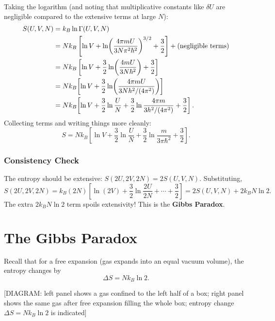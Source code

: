 Taking the logarithm (and noting that multiplicative constants like $\delta U$ are negligible compared to the extensive terms at large $N$):
\begin{align}
    S(U, V, N) &= k_B\ln\Gamma(U,V,N) \notag\\
    &= Nk_B\left[\ln V + \ln\!\left(\frac{4\pi mU}{3N\pi^2\hbar^2}\right)^{3/2} + \frac{3}{2}\right] + \text{(negligible terms)} \notag\\
    &= Nk_B\left[\ln V + \frac{3}{2}\ln\!\left(\frac{4mU}{3N\hbar^2}\right) + \frac{3}{2}\right] \notag\\
    &= Nk_B\!\left[\ln V + \frac{3}{2}\ln\!\left(\frac{4\pi mU}{3Nh^2/(4\pi^2)}\right)\right] \notag\\
    &= Nk_B\!\left[\ln V + \frac{3}{2}\ln\frac{U}{N} + \frac{3}{2}\ln\frac{4\pi m}{3h^2/(4\pi^2)} + \frac{3}{2}\right].
\end{align}
Collecting terms and writing things more cleanly:
\begin{equation}
    S = Nk_B\!\left[\ln V + \frac{3}{2}\ln\frac{U}{N} + \frac{3}{2}\ln\frac{m}{3\pi\hbar^2} + \frac{3}{2}\right].
\end{equation}

\subsubsection{Consistency Check}

The entropy should be extensive: $S(2U, 2V, 2N) = 2S(U, V, N)$. Substituting,
\begin{equation}
    S(2U, 2V, 2N) = k_B(2N)\!\left[\ln(2V) + \frac{3}{2}\ln\frac{2U}{2N} + \cdots + \frac{3}{2}\right] = 2S(U, V, N) + 2k_B N\ln 2.
\end{equation}
The extra $2k_B N\ln 2$ term spoils extensivity! This is the \textbf{Gibbs Paradox}.


\section{The Gibbs Paradox}

Recall that for a free expansion (gas expands into an equal vacuum volume), the entropy changes by
\begin{equation}
    \Delta S = Nk_B\ln 2.
\end{equation}

\begin{center}[DIAGRAM: left panel shows a gas confined to the left half of a box; right panel shows the same gas after free expansion filling the whole box; entropy change $\Delta S = Nk_B\ln 2$ is indicated]\end{center}

